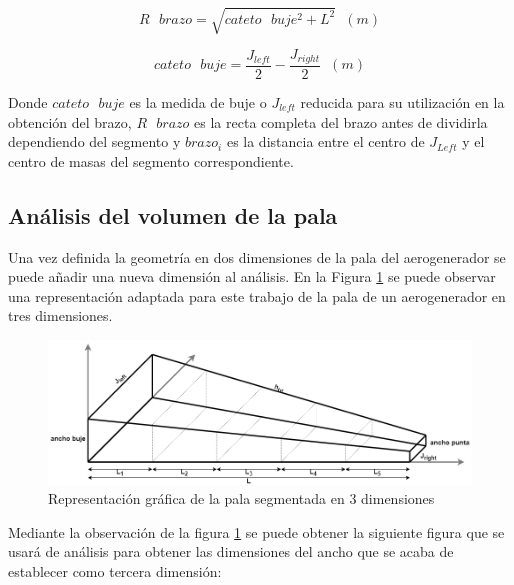 \begin{equation}
R \text{ } brazo = \sqrt{cateto \text{ } buje^{2} + L^{2}} \hspace{7pt} (m)
\end{equation}

\begin{equation}
cateto \text{ } buje = \dfrac{J_{left}}{2} - \dfrac{J_{right}}{2} \hspace{7pt} (m)
\end{equation}


Donde $cateto \text{ } buje$ es la medida de buje o $J_{left}$ reducida para su utilización en la obtención del brazo, $R \text{ } brazo$ es la recta completa del brazo antes de dividirla dependiendo del segmento y $brazo_i$ es la distancia entre el centro de $J_{Left}$ y el centro de masas del segmento correspondiente.

\subsection{Análisis del volumen de la pala}
\label{section:volumen_pala}

Una vez definida la geometría en dos dimensiones de la pala del aerogenerador se puede añadir una nueva dimensión al análisis. En la Figura \ref{fig:analisis_volumen} se puede observar una representación adaptada para este trabajo de la pala de un aerogenerador en tres dimensiones.

    \begin{figure}[H]
    \centering
    \includegraphics[width=1\textwidth]{images/pala 3d segmentada enorme.png}
    \caption{Representación gráfica de la pala segmentada en 3 dimensiones}
    \label{fig:analisis_volumen}
    \end{figure}

Mediante la observación de la figura \ref{fig:analisis_volumen} se puede obtener la siguiente figura que se usará de análisis para obtener las dimensiones del ancho que se acaba de establecer como tercera dimensión:

